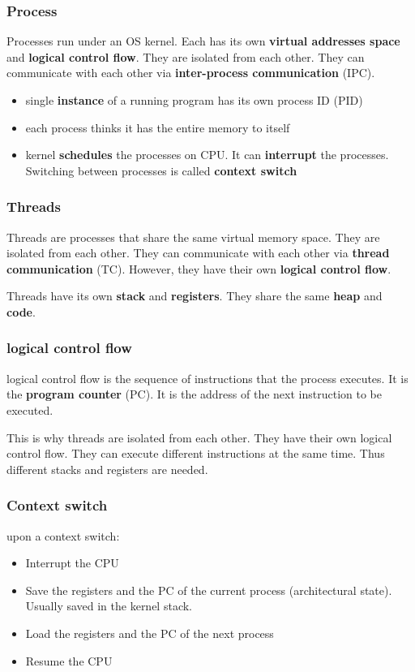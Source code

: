\documentclass[letterpaper,12pt]{article}
\begin{document}
\subsubsection{Process}
Processes run under an OS kernel. Each has its own \textbf{virtual addresses
    space} and \textbf{logical control flow}. They are isolated from each other.
They can communicate with each other via \textbf{inter-process communication}
(IPC).

\begin{itemize}
    \item single \textbf{instance} of a running program has its own process ID (PID)
    \item each process thinks it has the entire memory to itself
    \item kernel \textbf{schedules} the processes on CPU. It can \textbf{interrupt} the
          processes. Switching between processes is called \textbf{context switch}
\end{itemize}
\subsubsection{Threads}
Threads are processes that share the same virtual memory space. They are
isolated from each other. They can communicate with each other via
\textbf{thread communication} (TC). However, they have their own
\textbf{logical control flow}.

Threads have its own \textbf{stack} and \textbf{registers}. They share the same
\textbf{heap} and \textbf{code}.
\subsubsection{logical control flow}
logical control flow is the sequence of instructions that the process executes.
It is the \textbf{program counter} (PC). It is the address of the next
instruction to be executed.

This is why threads are isolated from each other. They have their own logical
control flow. They can execute different instructions at the same time. Thus
different stacks and registers are needed.
\subsubsection{Context switch}
upon a context switch:\begin{itemize}
    \item Interrupt the CPU
    \item Save the registers and the PC of the current process (architectural state).
          Usually saved in the kernel stack.
    \item Load the registers and the PC of the next process
    \item Resume the CPU
\end{itemize}
\end{document}
